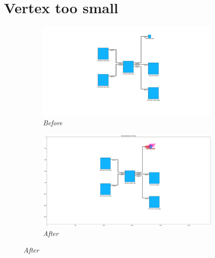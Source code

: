\documentclass{article}
\begin{document}
\section{Vertex too small}
\begin{figure}[H]
    \centering
    \begin{subfigure}[t]{0.9\textwidth}
        \centering
        \includegraphics[width=\textwidth]{testcases/vertex_too_small/133525-210774_input_image_after_preprocessing.png}
        \caption*{\textit{Before}}
    \end{subfigure}
    \newline
    \begin{subfigure}[t]{0.9\textwidth}
        \centering
        \includegraphics[width=\textwidth]{testcases/vertex_too_small/133600-817717_element_bbox_errors_labeled_colored.png}
        \caption*{\textit{After}}
    \end{subfigure}
    \label{fig:vertex_too_small}
\end{figure}
\newpage
\end{document}
